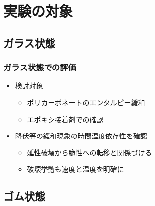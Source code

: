 \documentclass[1４pt, dvipdfmx]{beamer}
\begin{document}
\section{実験の対象}

\subsection{ガラス状態}
	\begin{frame}
		\frametitle{ガラス状態での評価}
		\begin{itemize}
			\item 検討対象
			\begin{itemize}
				\item ポリカーボネートのエンタルピー緩和
				\item エポキシ接着剤での確認
			\end{itemize}
			\item 降伏等の緩和現象の時間温度依存性を確認
			\begin{itemize}
				\item 延性破壊から脆性への転移と関係づける
				\item 破壊挙動も速度と温度を明確に
			\end{itemize}
		\end{itemize}
		
	
	\end{frame}
\subsection{ゴム状態}
\end{document}
